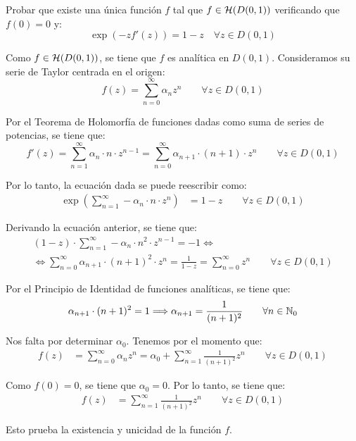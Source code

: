 \begin{ejercicio}
    Probar que existe una única función $f$ tal que $f \in \mathcal{H}(D(0,1))$ verificando que $f(0) = 0$ y:
    \begin{equation*}
        \exp\left({-z} f'(z)\right) = 1-z \quad \forall z \in D(0,1)
    \end{equation*}

    Como $f\in \mathcal{H}(D(0,1))$, se tiene que $f$ es analítica en $D(0,1)$. Consideramos su serie de Taylor centrada en el origen:
    \begin{equation*}
        f(z) = \sum_{n=0}^{\infty} \alpha_n z^n \qquad \forall z \in D(0,1)
    \end{equation*}

    Por el Teorema de Holomorfía de funciones dadas como suma de series de potencias, se tiene que:
    \begin{equation*}
        f'(z) = \sum_{n=1}^{\infty} \alpha_n\cdot n\cdot z^{n-1}
        = \sum_{n=0}^{\infty} \alpha_{n+1}\cdot (n+1)\cdot z^{n} \qquad \forall z \in D(0,1)
    \end{equation*}

    Por lo tanto, la ecuación dada se puede reescribir como:
    \begin{align*}
        \exp\left(\sum_{n=1}^{\infty} -\alpha_{n}\cdot n\cdot z^{n}\right) &= 1-z\qquad \forall z \in D(0,1)
    \end{align*}

    Derivando la ecuación anterior, se tiene que:
    \begin{multline*}
        (1-z)\cdot \sum_{n=1}^{\infty} -\alpha_{n}\cdot n^2\cdot z^{n-1} = -1
        \iff\\\iff \sum_{n=0}^{\infty} \alpha_{n+1}\cdot (n+1)^2\cdot z^{n} = \frac{1}{1-z}
        = \sum_{n=0}^{\infty} z^{n} \qquad \forall z \in D(0,1)
    \end{multline*}

    Por el Principio de Identidad de funciones analíticas, se tiene que:
    \begin{equation*}
        \alpha_{n+1}\cdot (n+1)^2 = 1\Longrightarrow \alpha_{n+1} = \frac{1}{(n+1)^2} \qquad \forall n \in \mathbb{N}_0
    \end{equation*}

    Nos falta por determinar $\alpha_0$. Tenemos por el momento que:
    \begin{align*}
        f(z) &= \sum_{n=0}^{\infty} \alpha_n z^n = \alpha_0 + \sum_{n=1}^{\infty} \frac{1}{(n+1)^2} z^n\qquad \forall z \in D(0,1)
    \end{align*}

    Como $f(0)=0$, se tiene que $\alpha_0=0$. Por lo tanto, se tiene que:
    \begin{align*}
        f(z) &= \sum_{n=1}^{\infty} \frac{1}{(n+1)^2} z^n\qquad \forall z \in D(0,1)
    \end{align*}

    Esto prueba la existencia y unicidad de la función $f$.
\end{ejercicio}

